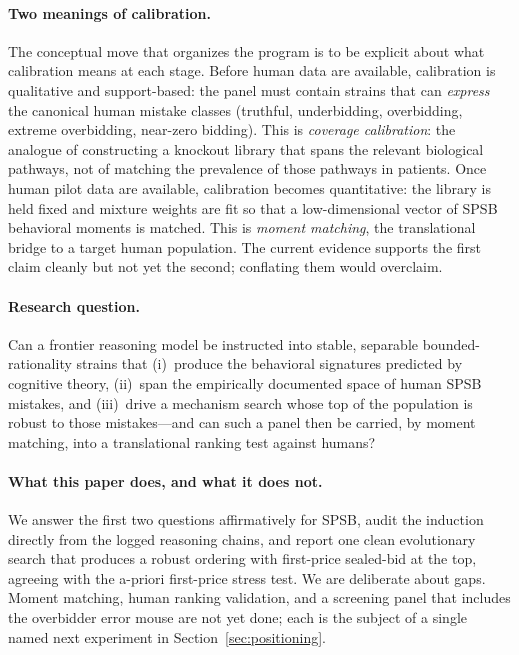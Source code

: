 \documentclass[12pt]{article}
\newcommand{\SPSB}{SPSB}
\begin{document}
\paragraph{Two meanings of calibration.} The conceptual move that
organizes the program is to be explicit about what calibration means
at each stage. Before human data are available, calibration is
qualitative and support-based: the panel must contain strains that
can \emph{express} the canonical human mistake classes (truthful,
underbidding, overbidding, extreme overbidding, near-zero bidding).
This is \emph{coverage calibration}: the analogue of constructing a
knockout library that spans the relevant biological pathways, not of
matching the prevalence of those pathways in patients. Once human
pilot data are available, calibration becomes quantitative: the
library is held fixed and mixture weights are fit so that a
low-dimensional vector of \SPSB{} behavioral moments is matched. This
is \emph{moment matching}, the translational bridge to a target human
population. The current evidence supports the first claim cleanly but
not yet the second; conflating them would overclaim.

\paragraph{Research question.} Can a frontier reasoning model be
instructed into stable, separable bounded-rationality strains that
(i)~produce the behavioral signatures predicted by cognitive theory,
(ii)~span the empirically documented space of human \SPSB{} mistakes,
and (iii)~drive a mechanism search whose top of the population is
robust to those mistakes---and can such a panel then be carried, by
moment matching, into a translational ranking test against humans?

\paragraph{What this paper does, and what it does not.} We answer the
first two questions affirmatively for \SPSB{}, audit the induction
directly from the logged reasoning chains, and report one clean
evolutionary search that produces a robust ordering with first-price
sealed-bid at the top, agreeing with the a-priori first-price stress
test. We are deliberate about gaps. Moment matching, human
ranking validation, and a screening panel that includes the overbidder
error mouse are not yet done; each is the subject of a single named
next experiment in Section~\ref{sec:positioning}.
\end{document}

